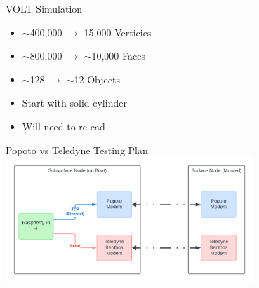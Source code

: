 

\begin{frame}{VOLT Simulation}
    \begin{itemize}
        \item $\sim$400,000 $\rightarrow$ 15,000 Verticies
        \item $\sim$800,000 $\rightarrow$ $\sim$10,000 Faces
        \item $\sim$128 $\rightarrow$ $\sim$12 Objects
        \item Start with solid cylinder
        \item Will need to re-cad 
    \end{itemize}    
\end{frame}

\begin{frame}{Popoto vs Teledyne Testing Plan}
    \centering
    \includegraphics[height=0.7\textheight,width=0.7\textwidth,keepaspectratio]{images/VOLT/VOLT-TestingPlan.png}
\end{frame}






